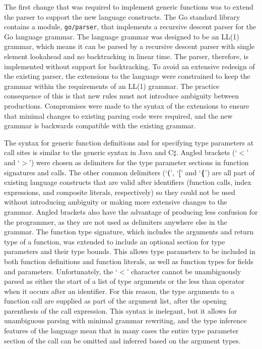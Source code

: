 \documentclass[letterpaper,twocolumn,11pt]{article}
\begin{document}
The first change that was required to implement generic functions was to extend the parser to support the new language constructs. The Go standard library contains a module, \texttt{go/parser}, that implements a recursive descent parser for the Go language grammar. The language grammar was designed to be an LL(1) grammar, which means it can be parsed by a recursive descent parser with single element lookahead and no backtracking in linear time. The parser, therefore, is implemented without support for backtracking. To avoid an extensive redesign of the existing parser, the extensions to the language were constrained to keep the grammar within the requirements of an LL(1) grammar. The practice consequence of this is that new rules must not introduce ambiguity between productions. Compromises were made to the syntax of the extensions to ensure that minimal changes to existing parsing code were required, and the new grammar is backwards compatible with the existing grammar.

The syntax for generic function definitions and for specifying type parameters at call sites is similar to the generic syntax in Java and C$\sharp$. Angled brackets (`\textbf{$<$}' and `\textbf{$>$}') were chosen as delimiters for the type parameter sections in function signatures and calls. The other common delimiters (`\textbf{(}', `\textbf{[}' and `\textbf{\{}') are all part of existing language constructs that are valid after identifiers (function calls, index expressions, and composite literals, respectively) so they could not be used without introducing ambiguity or making more extensive changes to the grammar. Angled brackets also have the advantage of producing less confusion for the programmer, as they are not used as delimiters anywhere else in the grammar. The function type signature, which includes the arguments and return type of a function, was extended to include an optional section for type parameters and their type bounds. This allows type parameters to be included in both function definitions and function literals, as well as function types for fields and parameters. Unfortunately, the `\textbf{$<$}' character cannot be unambiguously parsed as either the start of a list of type arguments or the less than operator when it occurs after an identifier. For this reason, the type arguments to a function call are supplied as part of the argument list, after the opening parenthesis of the call expression. This syntax is inelegant, but it allows for unambiguous parsing with minimal grammar rewriting, and the type inference features of the language mean that in many cases the entire type parameter section of the call can be omitted and inferred based on the argument types.
\end{document}
